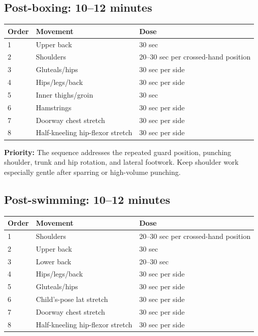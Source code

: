 \documentclass[10pt,letterpaper]{article}
\begin{document}
\subsection{Post-boxing: 10--12 minutes}

\begin{tabularx}{\textwidth}{@{}C{0.5in}Y C{1.35in}@{}}
\toprule
{}
\color{white}\textbf{Order} & \color{white}\textbf{Movement} & \color{white}\textbf{Dose} \\
 & Upper back & 30 sec \\
2 & Shoulders & 20--30 sec per crossed-hand position \\
3 & Gluteals/hips & 30 sec per side \\
4 & Hips/legs/back & 30 sec per side \\
5 & Inner thighs/groin & 30 sec \\
6 & Hamstrings & 30 sec per side \\
7 & Doorway chest stretch & 30 sec per side \\
8 & Half-kneeling hip-flexor stretch & 30 sec per side \\
\bottomrule
\end{tabularx}

\textbf{Priority:} The sequence addresses the repeated guard position, punching shoulder, trunk and hip rotation, and lateral footwork. Keep shoulder work especially gentle after sparring or high-volume punching.

\subsection{Post-swimming: 10--12 minutes}

\begin{tabularx}{\textwidth}{@{}C{0.5in}Y C{1.35in}@{}}
\toprule
{}
\color{white}\textbf{Order} & \color{white}\textbf{Movement} & \color{white}\textbf{Dose} \\
 & Shoulders & 20--30 sec per crossed-hand position \\
2 & Upper back & 30 sec \\
3 & Lower back & 20--30 sec \\
4 & Hips/legs/back & 30 sec per side \\
5 & Gluteals/hips & 30 sec per side \\
6 & Child's-pose lat stretch & 30 sec per side \\
7 & Doorway chest stretch & 30 sec per side \\
8 & Half-kneeling hip-flexor stretch & 30 sec per side \\
\bottomrule
\end{tabularx}
\end{document}
